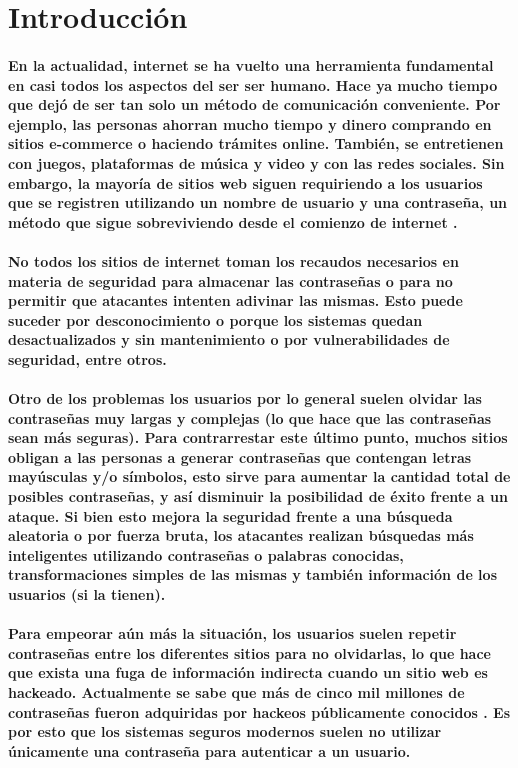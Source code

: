\documentclass{article}
\begin{document}
\section{Introducción}
\paragraph{
En la actualidad, internet se ha vuelto una herramienta fundamental en casi todos los aspectos del ser ser humano. Hace ya mucho tiempo que dejó de ser tan solo un método de comunicación conveniente. Por ejemplo, las personas ahorran mucho tiempo y dinero comprando en sitios e-commerce o haciendo trámites online. También, se entretienen con juegos, plataformas de música y video y con las redes sociales. Sin embargo, la mayoría de sitios web siguen requiriendo a los usuarios que se registren utilizando un nombre de usuario y una contraseña, un método que sigue sobreviviendo desde el comienzo de internet \cite{internet}.
}
\paragraph{
 No todos los sitios de internet toman los recaudos necesarios en materia de seguridad para almacenar las contraseñas o para no permitir que atacantes intenten adivinar las mismas. Esto puede suceder por desconocimiento o porque los sistemas quedan desactualizados y sin mantenimiento o por vulnerabilidades de seguridad, entre otros.
}
\paragraph{
Otro de los problemas los usuarios por lo general suelen olvidar las contraseñas muy largas y complejas (lo que hace que las contraseñas sean más seguras). Para contrarrestar este último punto, muchos sitios obligan a las personas a generar contraseñas que contengan letras mayúsculas y/o símbolos, esto sirve para aumentar la cantidad total de posibles contraseñas, y así disminuir la posibilidad de éxito frente a un ataque. Si bien esto mejora la seguridad frente a una búsqueda aleatoria o por fuerza bruta, los atacantes realizan búsquedas más inteligentes utilizando contraseñas o palabras conocidas, transformaciones simples de las mismas y también información de los usuarios (si la tienen).
}
\paragraph{
Para empeorar aún más la situación, los usuarios suelen repetir contraseñas entre los diferentes sitios para no olvidarlas, lo que hace que exista una fuga de información indirecta cuando un sitio web es hackeado. Actualmente se sabe que más de cinco mil millones de contraseñas fueron adquiridas por hackeos públicamente conocidos \cite{haveibeenpwned}. Es por esto que los sistemas seguros modernos suelen no utilizar únicamente una contraseña para autenticar a un usuario.
}
\end{document}
